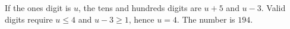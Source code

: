 If the ones digit is $u$, the tens and hundreds digits are $u+5$ and $u-3$. Valid digits require $u\le4$ and $u-3\ge1$, hence $u=4$. The number is $\boxed{194}$.
